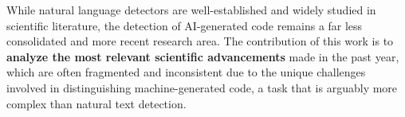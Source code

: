 While natural language detectors are well-established and widely 
studied in scientific literature, the detection of AI-generated code 
remains a far less consolidated and more recent research area. 
The contribution of this work is to \textbf{analyze the most relevant 
scientific advancements} made in the past year, which are often fragmented and 
inconsistent due to the unique challenges involved in distinguishing 
machine-generated code, a task that is arguably more complex than natural 
text detection.





